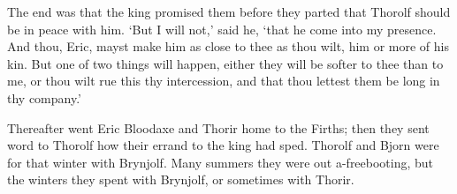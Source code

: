 The end was that the king promised them before they parted that Thorolf should be in peace with him. `But I will not,' said he, `that he come into my presence. And thou, Eric, mayst make him as close to thee as thou wilt, him or more of his kin. But one of two things will happen, either they will be softer to thee than to me, or thou wilt rue this thy intercession, and that thou lettest them be long in thy company.'

Thereafter went Eric Bloodaxe and Thorir home to the Firths; then they sent word to Thorolf how their errand to the king had sped. Thorolf and Bjorn were for that winter with Brynjolf. Many summers they were out a-freebooting, but the winters they spent with Brynjolf, or sometimes with Thorir.
